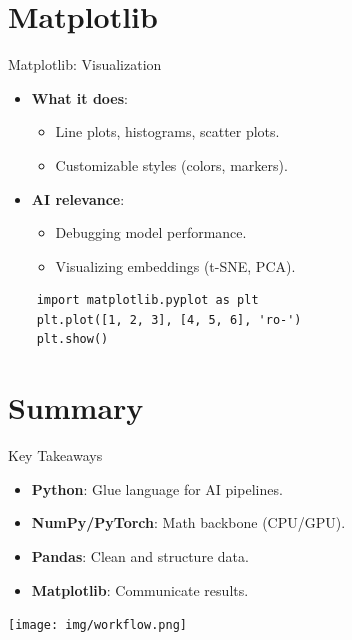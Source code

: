 \documentclass{beamer}
\begin{document}
\section{Matplotlib}

\begin{frame}{Matplotlib: Visualization}
  \begin{itemize}
    \item \textbf{What it does}:
      \begin{itemize}
        \item Line plots, histograms, scatter plots.
        \item Customizable styles (colors, markers).
      \end{itemize}
    \item \textbf{AI relevance}:
      \begin{itemize}
        \item Debugging model performance.
        \item Visualizing embeddings (t-SNE, PCA).
      \end{itemize}
  \end{itemize}
  \begin{example}
    \begin{lstlisting}
    import matplotlib.pyplot as plt
    plt.plot([1, 2, 3], [4, 5, 6], 'ro-')
    plt.show()
    \end{lstlisting}
  \end{example}
\end{frame}

\section{Summary}

\begin{frame}{Key Takeaways}
  \begin{itemize}
    \item \textbf{Python}: Glue language for AI pipelines.
    \item \textbf{NumPy/PyTorch}: Math backbone (CPU/GPU).
    \item \textbf{Pandas}: Clean and structure data.
    \item \textbf{Matplotlib}: Communicate results.
  \end{itemize}
  \vspace{1em}
  \centering
  \texttt{[image: img/workflow.png]}  %
\end{frame}
\end{document}
